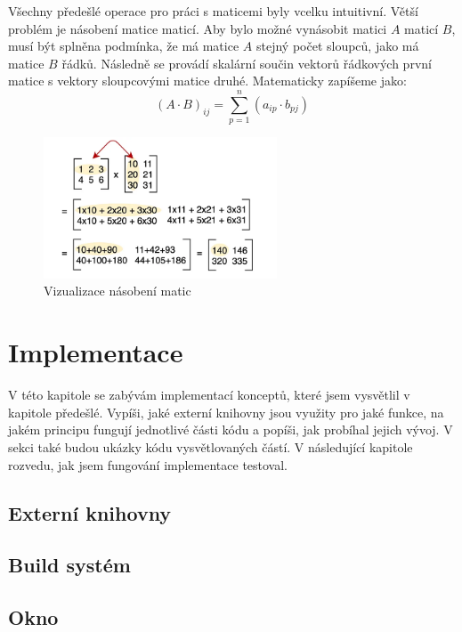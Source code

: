 \documentclass[12pt]{article}
\begin{document}
Všechny předešlé operace pro práci s maticemi byly vcelku intuitivní. Větší problém je násobení matice maticí. Aby bylo možné vynásobit matici $A$ maticí $B$, musí být splněna podmínka, že má matice $A$ stejný počet sloupců, jako má matice $B$ řádků. Následně se provádí skalární součin vektorů řádkových první matice s vektory sloupcovými matice druhé. Matematicky zapíšeme jako:
\begin{equation}
    (A \cdot B)_{ij} = \sum_{p=1}^{n}(a_{ip} \cdot {b_{pj}})
\end{equation}
\begin{figure}[h]
    \centering
    \includegraphics[height=4.2cm]{matrix_mp.png}
    \caption[Vizualizace násobení matic]{Vizualizace násobení matic \cite{matrix_mp_img}}
    \label{fig:Vizualizace násobení matic}
\end{figure}
\section{Implementace}

V této kapitole se zabývám implementací konceptů, které jsem vysvětlil v kapitole předešlé. Vypíši, jaké externí knihovny jsou využity pro jaké funkce, na jakém principu fungují jednotlivé části kódu a popíši, jak probíhal jejich vývoj. V sekci také budou ukázky kódu vysvětlovaných částí. V následující kapitole rozvedu, jak jsem fungování implementace testoval.

\subsection{Externí knihovny}

\subsection{Build systém}

\subsection{Okno}
\end{document}
